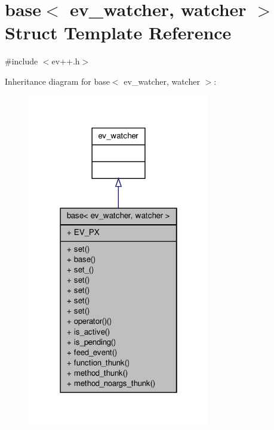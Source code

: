 \hypertarget{structev_1_1base}{\section{base$<$ ev\-\_\-watcher, watcher $>$ \-Struct \-Template \-Reference}
\label{structev_1_1base}
}


{\ttfamily \#include $<$ev++.\-h$>$}



\-Inheritance diagram for base$<$ ev\-\_\-watcher, watcher $>$\-:
\nopagebreak
\begin{figure}[H]
\begin{center}
\leavevmode
\includegraphics[width=226pt]{structev_1_1base__inherit__graph}
\end{center}
\end{figure}


